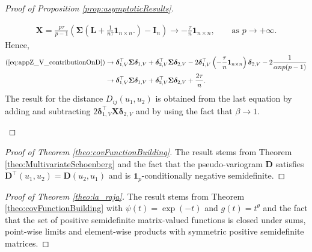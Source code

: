 \documentclass[12pt]{article}
\theoremstyle{plain}
\theoremstyle{remark}
\newcommand{\round}[1]{\left( #1 \right)}
\newcommand{\onenn}[0]{{\mathbf{1}_{n\times n}}}
\newcommand{\onep}[0]{{\mathbf{1}_{p}}}
\newcommand{\dVec}[1]{{\bm{#1}}}            %
\newcommand{\latMatr}[1]{\mathbf{#1}}          %
\newcommand{\grMatr}[1]{{\boldsymbol{#1}}}   %
\begin{document}
\begin{proof}[Proof of Proposition \ref{prop:asymptoticResults}]
\begin{enumerate}
{            \begin{align*}
                \latMatr X = \frac{p\tau}{p-1} \round{\grMatr{\Sigma} \round{\latMatr L + \frac{1}{n\tau}\onenn.}-\latMatr I_n} \to -\frac{\tau}{n} \onenn, \qquad \text{as $p\to +\infty$.} 
            \end{align*}
            Hence,
            \begin{align*}
                (\ref{eq:appZ_V_contributionOnD})&\to \dVec{\delta}_{ {1,V}}^\top {\grMatr{\Sigma}} \dVec{\delta}_{ {1,V}} + \dVec{\delta}_{ {2,V}}^\top {\grMatr{\Sigma}} \dVec{\delta}_{ {2,V}}-2\dVec{\delta}_{ {1,V}}^\top \round{-\frac{\tau}{n}\onenn} \dVec{\delta}_{ {2,V}} -2\frac{1}{\alpha n p (p-1)}\\
                &\to \dVec{\delta}_{ {1,V}}^\top {\grMatr{\Sigma}} \dVec{\delta}_{ {1,V}} + \dVec{\delta}_{ {2,V}}^\top {\grMatr{\Sigma}} \dVec{\delta}_{ {2,V}}+\frac{2\tau}{n}.
            \end{align*}
            The result for the distance $D_{ij}(u_1,u_2)$ is obtained from the last equation by adding and subtracting $2\dVec{\delta}_{1,V}^\top \latMatr X \dVec{\delta}_{2,V}$ and by using the fact that $\beta\to 1$.
            } 
        \end{enumerate}
    \end{proof}
    
    \begin{proof}[Proof of Theorem \ref{theo:covFunctionBuilding}]
        The result stems from Theorem \ref{theo:MultivariateSchoenberg} and the fact that the pseudo-variogram ${\latMatr{D}}$ satisfies ${\latMatr{D}}^\top(u_1,u_2)={\latMatr{D}}(u_2,u_1)$ and is $\onep$-conditionally negative semidefinite.%
    \end{proof}
    
    
    \begin{proof}[Proof of Theorem \ref{theo:la_raja}]   
    {The result stems from Theorem \ref{theo:covFunctionBuilding} with $\psi(t)=\exp(-t)$ and {$g(t)=t^\theta$} and the fact that the set of positive semidefinite matrix-valued functions is closed under sums, point-wise limits and element-wise products with symmetric positive semidefinite matrices.}
    \end{proof}
    
\end{document}
